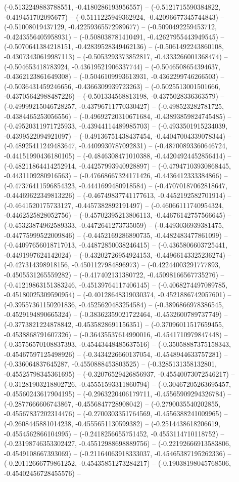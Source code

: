 (-0.5132249883788551, -0.4180286193956557) -- (-0.5121715590384822, -0.419451702095677) -- (-0.5111225949362924, -0.42096677345744843) -- (-0.51008019437129, -0.42259365572989677) -- (-0.5090492259453712, -0.4243556405958931) -- (-0.508038781410491, -0.42627955443949545) -- (-0.5070641384218151, -0.42839528349462136) -- (-0.5061492243860108, -0.43073430619987113) -- (-0.5053293373852817, -0.4333266001368474) -- (-0.504653418783924, -0.43619521906337744) -- (-0.5046508654394637, -0.4362123861649308) -- (-0.5046109993613931, -0.4362299746266503) -- (-0.5036431459246656, -0.4366309939723263) -- (-0.5025513001501666, -0.43705642988487226) -- (-0.501334568813198, -0.4375028336363579) -- (-0.49999215046728257, -0.43796711770330427) -- (-0.498523282781725, -0.4384465253056556) -- (-0.49692720310671684, -0.43893859824745485) -- (-0.49520311971725933, -0.43944114489985703) -- (-0.4933501915234039, -0.4399522094921097) -- (-0.49136751438437454, -0.44047004339078344) -- (-0.48925411249483647, -0.4409930787092831) -- (-0.48700893360646724, -0.44151990436180105) -- (-0.4846308471010388, -0.44204924452856414) -- (-0.48211864414252914, -0.44257993940928897) -- (-0.47947103930868445, -0.4431109280916563) -- (-0.47668667324171426, -0.4436412333384866) -- (-0.47376411596854323, -0.4441699480918584) -- (-0.47070187062818647, -0.44469622349813226) -- (-0.46749837741177613, -0.4452192582701914) -- (-0.4641520175733127, -0.4457382892191497) -- (-0.46066111740954324, -0.4462525828052756) -- (-0.45702395213806113, -0.44676142757566645) -- (-0.45323874962589333, -0.4472641273735059) -- (-0.4493036939381475, -0.44775999522009846) -- (-0.4452169286890735, -0.4482483477861099) -- (-0.44097656018717013, -0.44872850038246415) -- (-0.4365806603725441, -0.4491997624142024) -- (-0.43202726954924153, -0.44966143325236274) -- (-0.427314398918156, -0.4501127984896973) -- (-0.42244003291777893, -0.4505531265559282) -- (-0.417402131380722, -0.45098166567735276) -- (-0.41219863151383246, -0.45139764117406145) -- (-0.4068274497089785, -0.45180025309590954) -- (-0.40128648319030374, -0.4521886742057601) -- (-0.39557361150201836, -0.4525620483254584) -- (-0.3896866978386545, -0.4529194890665324) -- (-0.38362359021722464, -0.4532600789737749) -- (-0.3773821224878842, -0.4535828691156351) -- (-0.37096011517659455, -0.4538868791607326) -- (-0.36435537614990016, -0.4541710979847448) -- (-0.35756570108837393, -0.45443448485637516) -- (-0.35058887375158343, -0.45467597125498926) -- (-0.3434226660137054, -0.4548944633757281) -- (-0.336064837645287, -0.4550888453803525) -- (-0.3285131358132801, -0.45525798345361695) -- (-0.32076529426856937, -0.45540073072546217) -- (-0.31281903218802726, -0.45551593311860794) -- (-0.30467205263695457, -0.45560243617904195) -- (-0.2963220406179711, -0.45565909294326784) -- (-0.2877666606743867, -0.4556847728908042) -- (-0.2790035540202855, -0.45567837202314476) -- (-0.2700303351764569, -0.4556388241009965) -- (-0.2608445881014238, -0.4555651130599382) -- (-0.2514438618206619, -0.4554562866104995) -- (-0.2418256655751452, -0.4553114710118752) -- (-0.23198746353302427, -0.45512988698889756) -- (-0.22192666913583806, -0.4549108667393069) -- (-0.21164063918333037, -0.45465387195262336) -- (-0.20112666779861252, -0.45435851273284217) -- (-0.19038198045768506, -0.45402456728455576) -- 